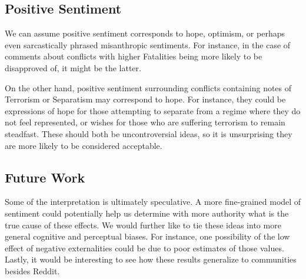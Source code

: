 \subsection{Positive Sentiment}
We can assume positive sentiment corresponds to hope, optimism, or perhaps even sarcastically phrased misanthropic sentiments. For instance, in the case of comments about conflicts with higher Fatalities being more likely to be disapproved of, it might be the latter. 

On the other hand, positive sentiment surrounding conflicts containing notes of Terrorism or Separatism may correspond to hope. For instance, they could be expressions of hope for those attempting to separate from a regime where they do not feel represented, or wishes for those who are suffering terrorism to remain steadfast. These should both be uncontroversial ideas, so it is unsurprising they are more likely to be considered acceptable.

\subsection{Future Work}
Some of the interpretation is ultimately speculative. A more fine-grained model of sentiment could potentially help us determine with more authority what is the true cause of these effects. We would further like to tie these ideas into more general cognitive and perceptual biases. For instance, one possibility of the low effect of negative externalities could be due to poor estimates of those values. Lastly, it would be interesting to see how these results generalize to communities besides Reddit.